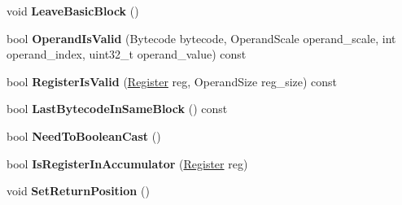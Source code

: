 \begin{DoxyCompactItemize}
\item 
void {\bfseries Leave\+Basic\+Block} ()\hypertarget{classv8_1_1internal_1_1interpreter_1_1_bytecode_array_builder_a3c21e43551d3574cd48805b3f45199fd}{}\label{classv8_1_1internal_1_1interpreter_1_1_bytecode_array_builder_a3c21e43551d3574cd48805b3f45199fd}

\item 
bool {\bfseries Operand\+Is\+Valid} (Bytecode bytecode, Operand\+Scale operand\+\_\+scale, int operand\+\_\+index, uint32\+\_\+t operand\+\_\+value) const \hypertarget{classv8_1_1internal_1_1interpreter_1_1_bytecode_array_builder_a290291742c56f322d43104382010778e}{}\label{classv8_1_1internal_1_1interpreter_1_1_bytecode_array_builder_a290291742c56f322d43104382010778e}

\item 
bool {\bfseries Register\+Is\+Valid} (\hyperlink{classv8_1_1internal_1_1interpreter_1_1_register}{Register} reg, Operand\+Size reg\+\_\+size) const \hypertarget{classv8_1_1internal_1_1interpreter_1_1_bytecode_array_builder_a6163a2239fb1e8b895c0e53da0618d8c}{}\label{classv8_1_1internal_1_1interpreter_1_1_bytecode_array_builder_a6163a2239fb1e8b895c0e53da0618d8c}

\item 
bool {\bfseries Last\+Bytecode\+In\+Same\+Block} () const \hypertarget{classv8_1_1internal_1_1interpreter_1_1_bytecode_array_builder_af8056ad920f2c6b87b926c5d7793d154}{}\label{classv8_1_1internal_1_1interpreter_1_1_bytecode_array_builder_af8056ad920f2c6b87b926c5d7793d154}

\item 
bool {\bfseries Need\+To\+Boolean\+Cast} ()\hypertarget{classv8_1_1internal_1_1interpreter_1_1_bytecode_array_builder_a9c9995421e225e56907e279d498a260b}{}\label{classv8_1_1internal_1_1interpreter_1_1_bytecode_array_builder_a9c9995421e225e56907e279d498a260b}

\item 
bool {\bfseries Is\+Register\+In\+Accumulator} (\hyperlink{classv8_1_1internal_1_1interpreter_1_1_register}{Register} reg)\hypertarget{classv8_1_1internal_1_1interpreter_1_1_bytecode_array_builder_af2310d5d8c7d62a9e78b6c0da9e67d23}{}\label{classv8_1_1internal_1_1interpreter_1_1_bytecode_array_builder_af2310d5d8c7d62a9e78b6c0da9e67d23}

\item 
void {\bfseries Set\+Return\+Position} ()\hypertarget{classv8_1_1internal_1_1interpreter_1_1_bytecode_array_builder_a039842104611cd99d617acdf5995fe12}{}\label{classv8_1_1internal_1_1interpreter_1_1_bytecode_array_builder_a039842104611cd99d617acdf5995fe12}


\end{DoxyCompactItemize}
